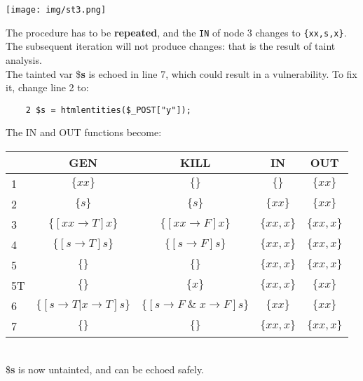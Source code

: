 \documentclass[a4paper, 10pt, titlepage]{article}
\begin{document}
\begin{center}
\texttt{[image: img/st3.png]}
\end{center}
The procedure has to be \textbf{repeated}, and the \lstinline|IN| of node 3 changes to \lstinline|{xx,s,x}|. The subsequent iteration will not produce changes: that is the result of taint analysis. \medskip\\
The tainted var \$\textbf{s} is echoed in line 7, which could result in a vulnerability. To fix it, change line 2 to:
\begin{lstlisting}
	2 $s = htmlentities($_POST["y"]);
\end{lstlisting}
The IN and OUT functions become: \medskip\\
\begin{tabular}{|l|c|c|c|c|}\hline
 & GEN & KILL & IN & OUT \\ \hline
1 & $\{xx\}$ & $\{\}$ & $\{\}$ & $\{xx\}$\\
2 & $\{s\}$ & $\{s\}$ & $\{xx\}$ & $\{xx\}$\\
3 & $\{[xx \rightarrow T]x\}$ & $\{[xx \rightarrow F]x\}$ & $\{xx,x\}$ & $\{xx, x\}$\\
4 & $\{[s \rightarrow T]s\}$ & $\{[s \rightarrow F]s\}$ & $\{xx, x\}$ & $\{xx, x\}$\\
5 & $\{\}$ & $\{\}$ & $\{xx, x\}$ & $\{xx, x\}$\\
5T & $\{\}$ & $\{x\}$ & $\{xx, x\}$ & $\{xx\}$\\
6 & $\{[s \rightarrow T | x \rightarrow T]s\}$ & $\{[s \rightarrow F \; \& \; x \rightarrow F]s\}$ & $\{xx\}$ & $\{xx\}$\\
7 & $\{\}$ & $\{\}$ & $\{xx, x\}$ & $\{xx, x\}$\\ \hline
\end{tabular} \medskip\\
\$\textbf{s} is now untainted, and can be echoed safely.

\newpage
\end{document}
